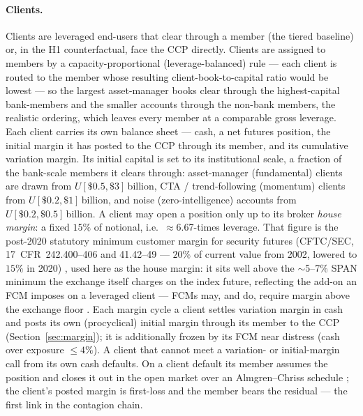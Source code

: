 \paragraph{Clients.}
Clients are leveraged end-users that clear through a member (the tiered baseline) or, in the H1
counterfactual, face the CCP directly. Clients are assigned to members by a capacity-proportional
(leverage-balanced) rule --- each client is routed to the member whose resulting client-book-to-capital
ratio would be lowest --- so the largest asset-manager books clear through the highest-capital
bank-members and the smaller accounts through the non-bank members, the realistic ordering, which
leaves every member at a comparable gross leverage. Each client carries its own balance sheet --- cash, a net
futures position, the initial margin it has posted to the CCP through its member, and its cumulative
variation margin. Its initial capital is set to its institutional scale, a fraction of the
bank-scale members it clears through: asset-manager (fundamental) clients are drawn from
$U[\$0.5,\$3]$\,billion, CTA / trend-following (momentum) clients from $U[\$0.2,\$1]$\,billion,
and noise (zero-intelligence) accounts from $U[\$0.2,\$0.5]$\,billion. A client may open a position
only up to its broker \emph{house margin}: a fixed $15\%$ of notional, i.e.\ $\approx$6.67-times
leverage. That figure is the post-2020 statutory minimum customer margin
for security futures (CFTC/SEC, 17~CFR~242.400--406 and 41.42--49 --- $20\%$ of current value from
2002, lowered to $15\%$ in 2020) \citep{cftc_sec_secfutures_margin}, used here as the
house margin: it sits well above the $\sim$5--7\% SPAN minimum the exchange itself charges on the
index future, reflecting the add-on an FCM imposes on a leveraged client --- FCMs may, and do,
require margin above the exchange floor \citep{nfa_margins}. Each margin cycle a client settles
variation margin in cash and posts its own (procyclical) initial margin through its member to the
CCP (Section~\ref{sec:margin}); it is additionally frozen by its FCM near distress (cash over
exposure $\le 4\%$). A client that cannot meet a variation- or
initial-margin call from its own cash defaults. On a client default its member assumes the position
and closes it out in the open market over an Almgren--Chriss schedule \citep{almgren_chriss_2000};
the client's posted margin is first-loss and the member bears the residual --- the first link in the
contagion chain.



